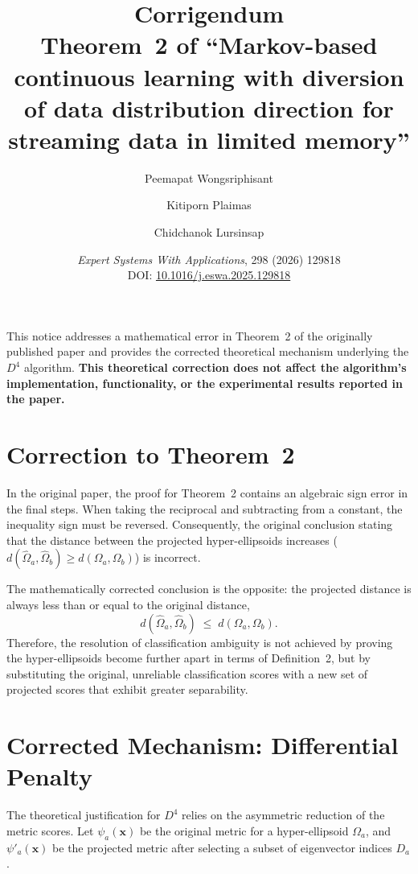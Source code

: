 \documentclass[11pt,a4paper]{article}
\title{\textbf{Corrigendum}\\[0.5em]
	\large Theorem~2 of ``Markov-based continuous learning with diversion of data distribution
	direction for streaming data in limited memory''}
\author{Peemapat Wongsriphisant \and Kitiporn Plaimas \and Chidchanok Lursinsap}
\date{%
	\textit{Expert Systems With Applications}, 298 (2026) 129818\\
	DOI: \href{https://doi.org/10.1016/j.eswa.2025.129818}{10.1016/j.eswa.2025.129818}
}
\begin{document}
	\maketitle
	
	\noindent
	This notice addresses a mathematical error in Theorem~2 of the originally published
	paper and provides the corrected theoretical mechanism underlying the $D^4$ algorithm.
	\textbf{This theoretical correction does not affect the algorithm's implementation,
		functionality, or the experimental results reported in the paper.}
	
	\section{Correction to Theorem~2}
	
	In the original paper, the proof for Theorem~2 contains an algebraic sign error in
	the final steps. When taking the reciprocal and subtracting from a constant, the
	inequality sign must be reversed. Consequently, the original conclusion stating that
	the distance between the projected hyper-ellipsoids increases
	($d(\hat{\Omega}_a, \hat{\Omega}_b) \geq d(\Omega_a, \Omega_b)$) is incorrect.
	
	The mathematically corrected conclusion is the opposite: the projected distance is always less than or equal to the original distance,
	\begin{equation}
		d(\hat\Omega_a,\hat\Omega_b) \;\le\; d(\Omega_a,\Omega_b). \tag{10, corrected}
	\end{equation}
	Therefore, the resolution of classification ambiguity is not achieved by proving the hyper-ellipsoids become further apart in terms of Definition~2, but by substituting the original, unreliable classification scores with a new set of projected scores that exhibit greater separability.
	
	\section{Corrected Mechanism: Differential Penalty}
	
	The theoretical justification for $D^4$ relies on the asymmetric reduction of the metric scores. Let $\psi_a(\mathbf{x})$ be the original metric for a hyper-ellipsoid $\Omega_a$, and $\psi'_a(\mathbf{x})$ be the projected metric after selecting a subset of eigenvector indices $D_a$.
\end{document}
